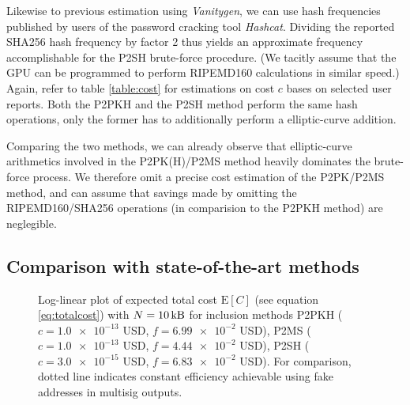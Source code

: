 \documentclass[10pt,a4paper,twocolumn]{article}
\begin{document}
Likewise to previous estimation using \emph{Vanitygen}, we can use hash frequencies published by users of the password cracking tool \emph{Hashcat}.
Dividing the reported SHA256 hash frequency by factor 2 thus yields an approximate frequency accomplishable for the P2SH brute-force procedure.
(We tacitly assume that the GPU can be programmed to perform RIPEMD160 calculations in similar speed.)
Again, refer to table \ref{table:cost} for estimations on cost $c$ bases on selected user reports.
Both the P2PKH and the P2SH method perform the same hash operations, only the former has to additionally perform a elliptic-curve addition.

Comparing the two methods, we can already observe that elliptic-curve arithmetics involved in the P2PK(H)/P2MS method heavily dominates the brute-force process.
We therefore omit a precise cost estimation of the P2PK/P2MS method, and can assume that savings made by omitting the RIPEMD160/SHA256 operations (in comparision to the P2PKH method) are neglegible.

\subsection{Comparison with state-of-the-art methods}


\begin{figure}[tb]
    \centering
    \caption{Log-linear plot of expected total cost $\mathrm{E}[C]$ (see equation \ref{eq:totalcost}) with $N=\SI{10}{\kilo\byte}$ for inclusion methods P2PKH ($c=\num{1.0e-13}$ USD, $f=\num{6.99e-2}$ USD), P2MS ($c=\num{1.0e-13}$ USD, $f=\num{4.44e-2}$ USD), P2SH ($c=\num{3.0e-15}$ USD, $f=\num{6.83e-2}$ USD). For comparison, dotted line indicates constant efficiency achievable using fake addresses in multisig outputs.}
\end{figure}
\end{document}
